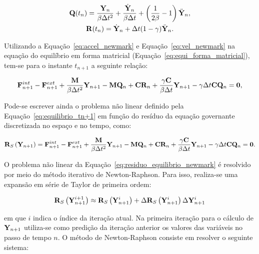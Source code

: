 \begin{gather}
	\mathbf{Q}(t_n) = \frac{\mathbf{Y}_n}{\beta \Delta t^2} + \frac{\dot{\mathbf{Y}}_n}{\beta \Delta t} + \left(\frac{1}{2\beta} -1 \right)\ddot{\mathbf{Y}}_n,\label{eq:Qn}\\
	\mathbf{R}(t_n) = \dot{\mathbf{Y}}_n+\Delta t(1-\gamma)\ddot{\mathbf{Y}}_n.\label{eq:Rn}
\end{gather}

Utilizando a Equação~\eqref{eq:accel_newmark} e Equação~\eqref{eq:vel_newmark} na equação do equilíbrio em forma matricial (Equação~\eqref{eq:equi_forma_matricial}), tem-se para o instante $t_{n+1}$ a seguinte relação:

\begin{gather}
	\mathbf{F}^{int}_{n+1}- \mathbf{F}^{ext}_{n+1} + \frac{\mathbf{M}}{\beta \Delta t^2} \mathbf{Y}_{n+1}-\mathbf{M} \mathbf{Q}_n+ \mathbf{C}\mathbf{R}_n + \frac{\gamma \mathbf{C}}{\beta \Delta t}\mathbf{Y}_{n+1} - \gamma\Delta t \mathbf{C}\mathbf{Q}_n = \mathbf{0},
	\label{eq:equilibrio_tn+1}
\end{gather}

Pode-se escrever ainda o problema não linear definido pela Equação~\eqref{eq:equilibrio_tn+1} em função do resíduo da equação governante
discretizada no espaço e no tempo, como:

\begin{gather}
	\mathbf{R}_S\left(\mathbf{Y}_{n+1}\right) = \mathbf{F}^{int}_{n+1}- \mathbf{F}^{ext}_{n+1} + \frac{\mathbf{M}}{\beta \Delta t^2} \mathbf{Y}_{n+1}-\mathbf{M} \mathbf{Q}_n+ \mathbf{C}\mathbf{R}_n + \frac{\gamma \mathbf{C}}{\beta \Delta t}\mathbf{Y}_{n+1} - \gamma\Delta t \mathbf{C}\mathbf{Q}_n= \mathbf{0}.
	\label{eq:residuo_equilibrio_newmark}
\end{gather}

O problema não linear da Equação~\eqref{eq:residuo_equilibrio_newmark} é resolvido por meio do método iterativo de Newton-Raphson. Para isso, realiza-se uma expansão em série de Taylor de primeira ordem:

\begin{gather}
	\mathbf{R}_S\left(\mathbf{Y}_{n+1}^{i+1}\right) \approx \mathbf{R}_S\left(\mathbf{Y}_{n+1}^{i}\right) + \Delta\mathbf{R}_S\left(\mathbf{Y}_{n+1}^{i}\right)\Delta\mathbf{Y}_{n+1}^{i} 
\end{gather}

\noindent em que $i$ indica o índice da iteração atual. Na primeira iteração para o cálculo de $\mathbf{Y}_{n+1}$ utiliza-se como predição da iteração anterior os valores das variáveis no passo de tempo $n$. O método de Newton-Raphson consiste em resolver o seguinte sistema:

